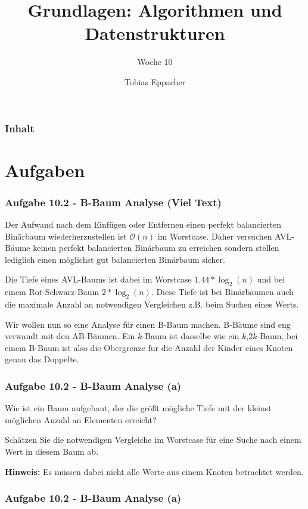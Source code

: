 \documentclass{beamer}
\title{Grundlagen: Algorithmen und Datenstrukturen}
\author{Tobias Eppacher}
\date{\presdatum}
\institute{School of Computation, Information and Technology}
\subtitle{Woche 10}
\begin{document}
\begin{frame}
  \titlepage
\end{frame}

\begin{frame}
  \frametitle{Inhalt}
  \tableofcontents[subsectionstyle=hide]
\end{frame}

\section{Aufgaben}



\begin{frame}
  \frametitle{Aufgabe 10.2 - B-Baum Analyse (Viel Text)}
  \small
  Der Aufwand nach dem Einfügen oder Entfernen einen perfekt balancierten Binärbaum
  wiederherzustellen ist $\mathcal{O}(n)$ im Worstcase. Daher versuchen AVL-Bäume keinen perfekt
  balancierten Binärbaum zu erreichen sondern stellen lediglich einen möglichst gut balancierten
  Binärbaum sicher.

  \medskip
  Die Tiefe eines AVL-Baums ist dabei im Worstcase $1.44 \ast \log_2(n)$ und bei
  einem Rot-Schwarz-Baum $2 \ast \log_2(n)$. Diese Tiefe ist bei Binärbäumen auch die maximale
  Anzahl an notwendigen Vergleichen z.B. beim Suchen eines Werts.

  \medskip
  Wir wollen nun so eine Analyse für einen B-Baum machen. B-Bäume sind eng verwandt mit
  den AB-Bäumen. Ein $k$-Baum ist dasselbe wie ein $k$,$2k$-Baum, bei einem B-Baum ist also
  die Obergrenze fur die Anzahl der Kinder eines Knoten genau das Doppelte.

\end{frame}

\begin{frame}[t]
  \frametitle{Aufgabe 10.2 - B-Baum Analyse (a)}
  Wie ist ein Baum aufgebaut, der die größt mögliche Tiefe mit der kleinst möglichen Anzahl
  an Elementen erreicht?

  \smallskip
  Schätzen Sie die notwendigen Vergleiche im Worstcase für eine Suche nach einem Wert in
  diesem Baum ab.

  \smallskip
  \textbf{Hinweis:} Es müssen dabei nicht alle Werte aus einem Knoten betrachtet werden.
\end{frame}

\begin{frame}
  \frametitle{Aufgabe 10.2 - B-Baum Analyse (a)}
\end{frame}
\end{document}
